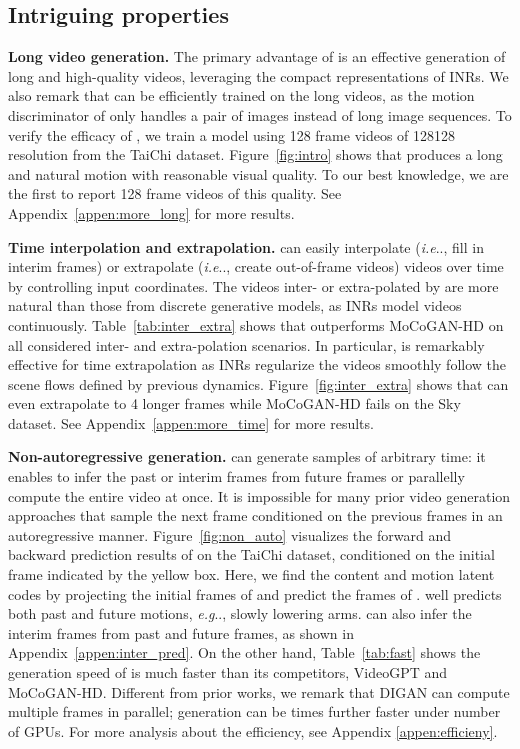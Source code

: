 \documentclass{article} \usepackage{iclr2022_conference,times}
\makeatletter
\DeclareRobustCommand\onedot{\futurelet\@let@token\@onedot}
\def\@onedot{\ifx\@let@token.\else.\null\fi\xspace}
\def\eg{\emph{e.g}\onedot} \def\Eg{\emph{E.g}\onedot}
\def\ie{\emph{i.e}\onedot} \def\Ie{\emph{I.e}\onedot}
\makeatother
\begin{document}
\subsection{Intriguing properties}
\label{subsec:exp-property}

\textbf{Long video generation.}
The primary advantage of \sname is an effective generation of long and high-quality videos, leveraging the compact representations of INRs. We also remark that \sname can be efficiently trained on the long videos, as the motion discriminator of \sname only handles a pair of images instead of long image sequences. To verify the efficacy of \sname, we train a model using 128 frame videos of 128128 resolution from the TaiChi dataset. Figure~\ref{fig:intro} shows that \sname produces a long and natural motion with reasonable visual quality. To our best knowledge, we are the first to report 128 frame videos of this quality. See Appendix~\ref{appen:more_long} for more results.

\textbf{Time interpolation and extrapolation.}
\sname can easily interpolate (\ie, fill in interim frames) or extrapolate (\ie, create out-of-frame videos) videos over time by controlling input coordinates. The videos inter- or extra-polated by \sname are more natural than those from discrete generative models, as INRs model videos continuously. Table~\ref{tab:inter_extra} shows that \sname outperforms MoCoGAN-HD on all considered inter- and extra-polation scenarios. In particular, \sname is remarkably effective for time extrapolation as INRs regularize the videos smoothly follow the scene flows defined by previous dynamics. Figure~\ref{fig:inter_extra} shows that \sname can even extrapolate to 4 longer frames while MoCoGAN-HD fails on the Sky dataset. 
See Appendix~\ref{appen:more_time} for more results.

\textbf{Non-autoregressive generation.}
\sname can generate samples of arbitrary time: it enables \sname to infer the past or interim frames from future frames or parallelly compute the entire video at once. It is impossible for many prior video generation approaches that sample the next frame conditioned on the previous frames in an autoregressive manner. Figure~\ref{fig:non_auto} visualizes the forward and backward prediction results of \sname on the TaiChi dataset, conditioned on the initial frame indicated by the yellow box. Here, we find the content and motion latent codes by projecting the initial frames of  and predict the frames of . \sname well predicts both past and future motions, \eg, slowly lowering arms. \sname can also infer the interim frames from past and future frames, as shown in Appendix~\ref{appen:inter_pred}. On the other hand, Table~\ref{tab:fast} shows the generation speed of \sname is much faster than its competitors, VideoGPT and MoCoGAN-HD. Different from prior works, we remark that DIGAN can compute multiple frames in parallel; generation can be  times further faster under  number of GPUs. For more analysis about the efficiency, see Appendix \ref{appen:efficieny}.
\end{document}
